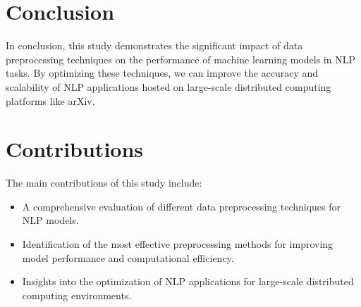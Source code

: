 \documentclass{article}
\begin{document}
\section{Conclusion}
In conclusion, this study demonstrates the significant impact of data preprocessing techniques on the performance of machine learning models in NLP tasks. By optimizing these techniques, we can improve the accuracy and scalability of NLP applications hosted on large-scale distributed computing platforms like arXiv.

\section{Contributions}
The main contributions of this study include:
\begin{itemize}
    \item A comprehensive evaluation of different data preprocessing techniques for NLP models.
    \item Identification of the most effective preprocessing methods for improving model performance and computational efficiency.
    \item Insights into the optimization of NLP applications for large-scale distributed computing environments.
\end{itemize}
\end{document}
